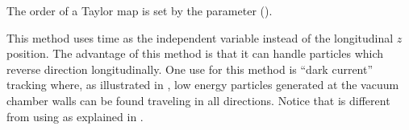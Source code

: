 \begin{description}
The order of a Taylor map is set by the 
parameter ().

\item[\vn{Time_Runge_Kutta}]
This method uses time as the independent variable instead of the longitudinal $z$ position. The
advantage of this method is that it can handle particles which reverse direction longitudinally.
One use for this method is ``dark current'' tracking where, as illustrated in ,
low energy particles generated at the vacuum chamber walls can be found traveling in all
directions. Notice that  is different from using  as
explained in .

\end{description}


